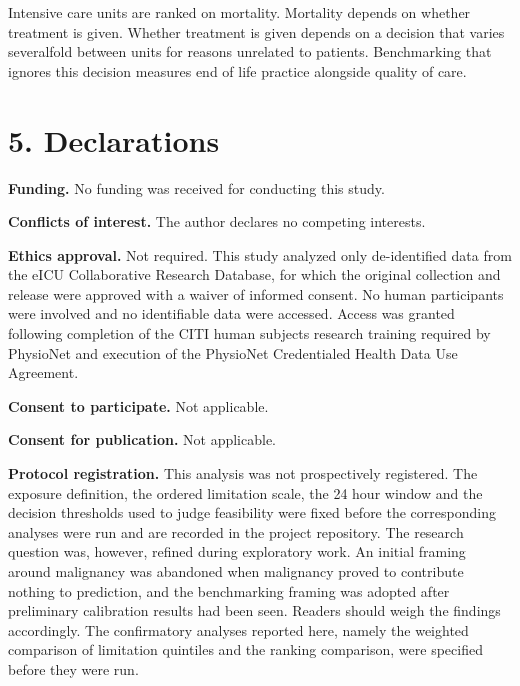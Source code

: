 \documentclass[12pt,a4paper]{article}
\begin{document}
Intensive care units are ranked on mortality. Mortality depends on whether
treatment is given. Whether treatment is given depends on a decision that varies
severalfold between units for reasons unrelated to patients. Benchmarking that
ignores this decision measures end of life practice alongside quality of care.

\newpage

\newpage

\newpage

\section*{5. Declarations}

\noindent\textbf{Funding.} No funding was received for conducting this study.

\noindent\textbf{Conflicts of interest.} The author declares no competing interests.

\noindent\textbf{Ethics approval.} Not required. This study analyzed only
de-identified data from the eICU Collaborative Research Database, for which the
original collection and release were approved with a waiver of informed consent. No
human participants were involved and no identifiable data were accessed. Access was
granted following completion of the CITI human subjects research training required by
PhysioNet and execution of the PhysioNet Credentialed Health Data Use Agreement.

\noindent\textbf{Consent to participate.} Not applicable.

\noindent\textbf{Consent for publication.} Not applicable.

\noindent\textbf{Protocol registration.} This analysis was not prospectively
registered. The exposure definition, the ordered limitation scale, the 24 hour window
and the decision thresholds used to judge feasibility were fixed before the
corresponding analyses were run and are recorded in the project repository. The
research question was, however, refined during exploratory work. An initial framing
around malignancy was abandoned when malignancy proved to contribute nothing to
prediction, and the benchmarking framing was adopted after preliminary calibration
results had been seen. Readers should weigh the findings accordingly. The confirmatory
analyses reported here, namely the weighted comparison of limitation quintiles and the
ranking comparison, were specified before they were run.
\end{document}
